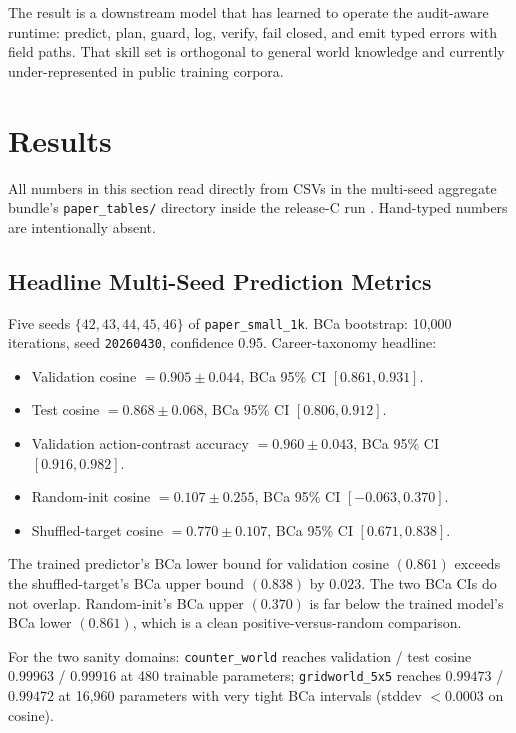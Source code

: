 \documentclass[10pt,twocolumn,letterpaper]{article}
\newcommand{\code}[1]{\texttt{\small #1}}
\newcommand{\sha}[1]{\texttt{\footnotesize\seqsplit{#1}}}
\begin{document}
The result is a downstream model that has learned to operate the
audit-aware runtime: predict, plan, guard, log, verify, fail
closed, and emit typed errors with field paths. That skill set is
orthogonal to general world knowledge and currently
under-represented in public training corpora.

\section{Results}
\label{sec:results}

All numbers in this section read directly from CSVs in the
multi-seed aggregate bundle's \code{paper\_tables/} directory
inside the release-C run
\sha{20260501T\_release\_c\_gate\_v2}.
Hand-typed numbers are intentionally absent.

\subsection{Headline Multi-Seed Prediction Metrics}

Five seeds $\{42, 43, 44, 45, 46\}$ of \code{paper\_small\_1k}.
BCa bootstrap: 10{,}000 iterations, seed \code{20260430},
confidence 0.95. Career-taxonomy headline:
\begin{itemize}
\item Validation cosine $= 0.905 \pm 0.044$, BCa 95\% CI
      \([0.861, 0.931]\).
\item Test cosine $= 0.868 \pm 0.068$, BCa 95\% CI \([0.806, 0.912]\).
\item Validation action-contrast accuracy
      $= 0.960 \pm 0.043$, BCa 95\% CI \([0.916, 0.982]\).
\item Random-init cosine $= 0.107 \pm 0.255$, BCa 95\% CI
      \([-0.063, 0.370]\).
\item Shuffled-target cosine $= 0.770 \pm 0.107$, BCa 95\% CI
      \([0.671, 0.838]\).
\end{itemize}

The trained predictor's BCa lower bound for validation cosine
$(0.861)$ exceeds the shuffled-target's BCa upper bound $(0.838)$
by $0.023$. The two BCa CIs do not overlap. Random-init's BCa
upper $(0.370)$ is far below the trained model's BCa lower
$(0.861)$, which is a clean positive-versus-random comparison.

For the two sanity domains: \code{counter\_world} reaches
validation / test cosine $0.99963$ / $0.99916$ at 480 trainable
parameters; \code{gridworld\_5x5} reaches $0.99473$ / $0.99472$ at
16{,}960 parameters with very tight BCa intervals
(stddev $< 0.0003$ on cosine).
\end{document}
